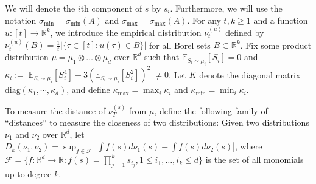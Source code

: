 \documentclass{article} %
\newcommand{\real}{\mathbb{R}}
\newcommand{\E}{\mathbb{E}}
\theoremstyle{definition}
\begin{document}
We will denote the $i$th component of $s$ by $s_i$. 
Furthermore, we will use the notation $\sigma_{\min}=\sigma_{\min}(A)$ and
$\sigma_{\max}=\sigma_{\max}(A)$.
For any $t,k \ge 1$ and a function $u:[t] \to \real^k$, we introduce the empirical distribution $\nu_t^{(u)}$ defined by
$\nu_t^{(u)}(B)=\tfrac{1}{t}|\{\tau \in [t]: u(\tau) \in B\}|$ for all Borel sets $B \subset \real^k$.
Fix some product distribution $\mu= \mu_1\otimes \ldots \otimes \mu_d$ over $\real^d$ 
such that $\E_{S_i\sim\mu_i}[S_i]=0$ and $\kappa_i := \vert \E_{S_i\sim \mu_i}[S_i^4] - 3\left(\E_{S_i\sim \mu_i}[S_i^2]\right)^2 \vert \neq 0$. Let
$K$ denote the diagonal matrix $\text{diag}(\kappa_1,\cdots,\kappa_d)$, and define $\kappa_{\max}=\max_{i} \kappa_i$ and $\kappa_{\min}=\min_{i} \kappa_i$.


To measure the distance of $\nu_T^{(s)}$ from $\mu$, define the following family of ``distances'' to measure the closeness of two distributions: Given two distributions $\nu_1$ and $\nu_2$ over $\real^d$, let $D_k(\nu_1,\nu_2) = \sup_{f\in\mathcal{F}} |\int f(s)d\nu_1(s) - \int f(s)d\nu_2(s)|$, where $\mathcal{F}=\{f:\real^d \to \real : f(s)=\prod_{j=1}^k s_{i_j}, 1 \le i_1,\ldots,i_k \le d\}$ is the set of all monomials up to degree $k$. 
\end{document}
